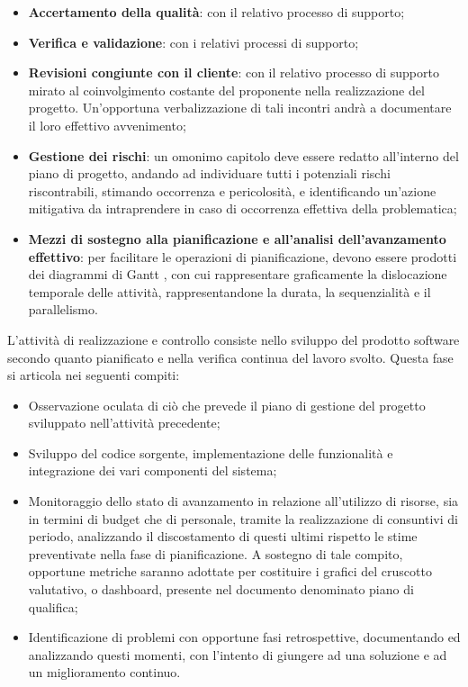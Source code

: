 \begin{enumerate}
\begin{itemize}
        \item \textbf{Accertamento della qualità}: con il relativo processo di supporto;
        \item \textbf{Verifica e validazione}: con i relativi processi di supporto;
        \item \textbf{Revisioni congiunte con il cliente}: con il relativo processo di supporto mirato al coinvolgimento costante del proponente nella realizzazione del progetto. Un’opportuna verbalizzazione di tali incontri andrà a documentare il loro effettivo avvenimento;
        \item \textbf{Gestione dei rischi}: un omonimo capitolo deve essere redatto all’interno del piano di progetto, andando ad individuare tutti i potenziali rischi riscontrabili, stimando occorrenza e pericolosità, e identificando un’azione mitigativa da intraprendere in caso di occorrenza effettiva della problematica;
        \item \textbf{Mezzi di sostegno alla pianificazione e all’analisi dell’avanzamento effettivo}: per facilitare le operazioni di pianificazione, devono essere prodotti dei diagrammi di Gantt , con cui rappresentare graficamente la dislocazione temporale delle attività, rappresentandone la durata, la sequenzialità e il parallelismo.
    \end{itemize}
\end{enumerate}

L'attività di realizzazione e controllo consiste nello sviluppo del prodotto software secondo quanto pianificato e nella verifica continua del lavoro svolto. Questa fase si articola nei seguenti compiti:
\begin{itemize}
    \item Osservazione oculata di ciò che prevede il piano di gestione del progetto sviluppato nell’attività precedente;
    \item Sviluppo del codice sorgente, implementazione delle funzionalità e integrazione dei vari componenti del sistema;
    \item Monitoraggio dello stato di avanzamento in relazione all’utilizzo di risorse, sia in termini di budget che di personale, tramite la realizzazione di consuntivi di periodo, analizzando il discostamento di questi ultimi rispetto le stime preventivate nella fase di pianificazione. A sostegno di tale compito, opportune metriche saranno adottate per costituire i grafici del cruscotto valutativo, o dashboard, presente nel documento denominato piano di qualifica;
    \item Identificazione di problemi con opportune fasi retrospettive, documentando ed analizzando questi momenti, con l’intento di giungere ad una soluzione e ad un miglioramento continuo.
\end{itemize}

